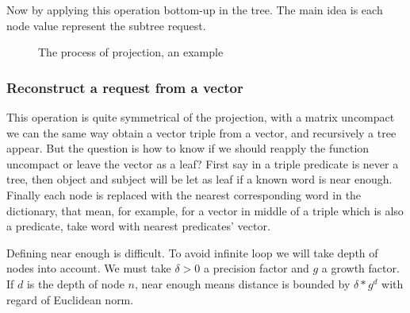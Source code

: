 Now by applying this operation bottom-up in the tree. The main idea is each node value represent the subtree request.

\FloatBarrier

\begin{figure}
\begin{center}
\caption{The process of projection, an example}
\end{center}
\end{figure}

\FloatBarrier

\subsubsection{Reconstruct a request from a vector}

This operation is quite symmetrical of the projection, with a matrix uncompact we can the same way obtain a vector triple from a vector, and recursively a tree appear. But the question is how to know if we should reapply the function uncompact or leave the vector as a leaf? First say in a triple predicate is never a tree, then object and subject will be let as leaf if a known word is near enough. Finally each node is replaced with the nearest corresponding word in the dictionary, that mean, for example, for a vector in middle of a triple which is also a predicate, take word with nearest predicates' vector.

Defining near enough is difficult. To avoid infinite loop we will take depth of nodes into account. We must take $\delta>0$ a precision factor and $g$ a growth factor. If $d$ is the depth of node $n$, near enough means distance is bounded by $\delta*g^d$ with regard of Euclidean norm.  

